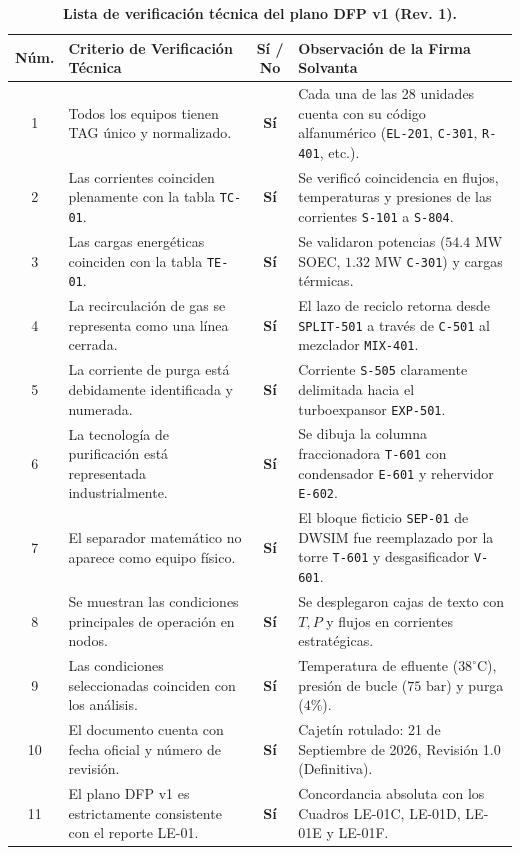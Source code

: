 \documentclass[10pt,letterpaper]{article}
\begin{document}
\begin{table}[H]
\centering
\small
\caption{\textbf{Lista de verificación técnica del plano DFP v1 (Rev. 1).}} \label{tab:cuadro15}
\begin{tabularx}{\textwidth}{c X c p{6.0cm}}
\toprule
\textbf{Núm.} & \textbf{Criterio de Verificación Técnica} & \textbf{Sí / No} & \textbf{Observación de la Firma Solvanta} \\
\midrule
1 & Todos los equipos tienen TAG único y normalizado. & \textbf{Sí} & Cada una de las 28 unidades cuenta con su código alfanumérico (\texttt{EL-201}, \texttt{C-301}, \texttt{R-401}, etc.). \\
2 & Las corrientes coinciden plenamente con la tabla \texttt{TC-01}. & \textbf{Sí} & Se verificó coincidencia en flujos, temperaturas y presiones de las corrientes \texttt{S-101} a \texttt{S-804}. \\
3 & Las cargas energéticas coinciden con la tabla \texttt{TE-01}. & \textbf{Sí} & Se validaron potencias ($54.4\text{ MW}$ SOEC, $1.32\text{ MW}$ \texttt{C-301}) y cargas térmicas. \\
4 & La recirculación de gas se representa como una línea cerrada. & \textbf{Sí} & El lazo de reciclo retorna desde \texttt{SPLIT-501} a través de \texttt{C-501} al mezclador \texttt{MIX-401}. \\
5 & La corriente de purga está debidamente identificada y numerada. & \textbf{Sí} & Corriente \texttt{S-505} claramente delimitada hacia el turboexpansor \texttt{EXP-501}. \\
6 & La tecnología de purificación está representada industrialmente. & \textbf{Sí} & Se dibuja la columna fraccionadora \texttt{T-601} con condensador \texttt{E-601} y rehervidor \texttt{E-602}. \\
7 & El separador matemático no aparece como equipo físico. & \textbf{Sí} & El bloque ficticio \texttt{SEP-01} de DWSIM fue reemplazado por la torre \texttt{T-601} y desgasificador \texttt{V-601}. \\
8 & Se muestran las condiciones principales de operación en nodos. & \textbf{Sí} & Se desplegaron cajas de texto con $T, P$ y flujos en corrientes estratégicas. \\
9 & Las condiciones seleccionadas coinciden con los análisis. & \textbf{Sí} & Temperatura de efluente ($38^\circ\text{C}$), presión de bucle ($75\text{ bar}$) y purga ($4\%$). \\
10 & El documento cuenta con fecha oficial y número de revisión. & \textbf{Sí} & Cajetín rotulado: 21 de Septiembre de 2026, Revisión 1.0 (Definitiva). \\
11 & El plano DFP v1 es estrictamente consistente con el reporte LE-01. & \textbf{Sí} & Concordancia absoluta con los Cuadros LE-01C, LE-01D, LE-01E y LE-01F. \\
\bottomrule
\end{tabularx}
\end{table}
\end{document}
